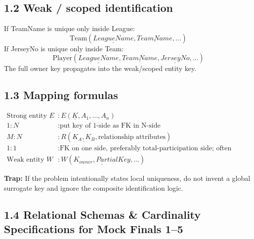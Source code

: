 \documentclass[10pt,a4paper]{article}
\begin{document}
\subsection{1.2 Weak / scoped identification}
If TeamName is unique only inside League:
\[
\mathrm{Team}(\underline{LeagueName},\underline{TeamName},\ldots)
\]
If JerseyNo is unique only inside Team:
\[
\mathrm{Player}(\underline{LeagueName},\underline{TeamName},\underline{JerseyNo},\ldots)
\]
The full owner key propagates into the weak/scoped entity key.

\subsection{1.3 Mapping formulas}
\begin{align*}
\text{Strong entity }E &: E(\underline{K},A_1,\ldots,A_n)\\
1{:}N &: \text{put key of 1-side as FK in N-side}\\
M{:}N &: R(\underline{K_A,K_B},\text{relationship attributes})\\
1{:}1 &: \text{FK on one side, preferably total-participation side; often UNIQUE}\\
\text{Weak entity }W &: W(\underline{K_{owner},PartialKey},\ldots)
\end{align*}

\begin{warningbox}
\textbf{Trap:} If the problem intentionally states local uniqueness, do not invent a global surrogate key and ignore the composite identification logic.
\end{warningbox}

\subsection{1.4 Relational Schemas \& Cardinality Specifications for Mock Finals 1--5}
\end{document}
